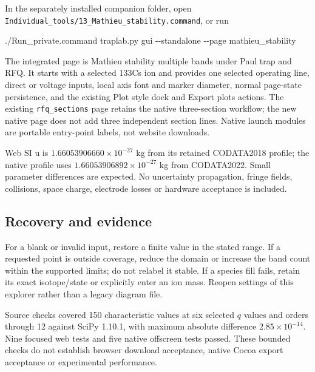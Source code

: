 \documentclass[
  aps,
  onecolumn,
  11pt]{revtex4-2}
\newenvironment{Shaded}{}{}
\newcommand{\AttributeTok}[1]{\textcolor[rgb]{0.49,0.56,0.16}{#1}}
\newcommand{\ExtensionTok}[1]{#1}
\newcommand{\NormalTok}[1]{#1}
\begin{document}
In the separately installed companion folder, open
\texttt{Individual\_tools/13\_Mathieu\_stability.command}, or run

\begin{Shaded}
\begin{Highlighting}[]
\ExtensionTok{./Run\_private.command}\NormalTok{ traplab.py gui }\AttributeTok{{-}{-}standalone} \AttributeTok{{-}{-}page}\NormalTok{ mathieu\_stability}
\end{Highlighting}
\end{Shaded}

The integrated page is Mathieu stability multiple bands under Paul trap
and RFQ. It starts with a selected 133Cs ion and provides one selected
operating line, direct or voltage inputs, local axis font and marker
diameter, normal page-state persistence, and the existing Plot style
dock and Export plots actions. The existing \texttt{rfq\_sections} page
retains the native three-section workflow; the new native page does not
add three independent section lines. Native launch modules are portable
entry-point labels, not website downloads.

Web SI u is \(1.66053906660\times10^{-27}\) kg from its retained
CODATA2018 profile; the native profile uses
\(1.66053906892\times10^{-27}\) kg from CODATA2022. Small parameter
differences are expected. No uncertainty propagation, fringe fields,
collisions, space charge, electrode losses or hardware acceptance is
included.

\subsection{Recovery and evidence}\label{recovery-and-evidence}

For a blank or invalid input, restore a finite value in the stated
range. If a requested point is outside coverage, reduce the domain or
increase the band count within the supported limits; do not relabel it
stable. If a species fill fails, retain its exact isotope/state or
explicitly enter an ion mass. Reopen settings of this explorer rather
than a legacy diagram file.

Source checks covered 150 characteristic values at six selected \(q\)
values and orders through 12 against SciPy 1.10.1, with maximum absolute
difference \(2.85\times10^{-14}\). Nine focused web tests and five
native offscreen tests passed. These bounded checks do not establish
browser download acceptance, native Cocoa export acceptance or
experimental performance.
\end{document}
